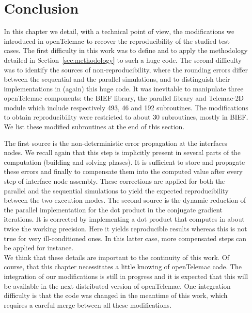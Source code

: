 \section{Conclusion}
%
In this chapter we detail, with a technical point of view,
the modifications we introduced in openTelemac to recover
the reproducibility of the studied test cases.
The first difficulty in this work was to define and
to apply the methodology detailed in Section~\ref{sec:methodology}
to such a huge code.
The second difficulty was to identify the sources of non-reproducibility,
\ie where the rounding errors differ between
the sequential and the parallel simulations, and to distinguish
their implementations in (again) this huge code.
%
It was inevitable to manipulate three openTelemac components:
the BIEF library, the parallel library and Telemac-2D module
which include respectively 493, 46 and 192 subroutines.
The modifications to obtain reproducibility were restricted to
about 30 subroutines, mostly in BIEF.
We list these modified subroutines at the end of this section.

The first source is the non-deterministic error propagation at the interfaces nodes.
We recall again that this step is implicitly present in several parts of the
computation (building and solving phases).
It is sufficient to store and propagate these errors and finally to
compensate them into the computed value after every step of interface node
assembly.
These corrections are applied for both the parallel and the
sequential simulations to yield the expected reproducibility
between the two execution modes.
The second source is the dynamic reduction of the parallel
implementation for the dot product in the conjugate gradient
iterations. It is corrected by implementing a dot product that
computes in about twice the working precision.
Here it yields reproducible results whereas this is not true
for very ill-conditioned ones. In this latter case, more compensated
steps can be applied for instance. \\

We think that these details are important to the continuity of this work.
Of course, that this chapter necessitates a little knowing of openTelemac code.
The integration of our modifications is still in progress and
it is expected that this will be
available in the next distributed version of openTelemac.
One integration difficulty is that the code
was changed in the meantime of this work, which requires
a careful merge between all these modifications.
%
